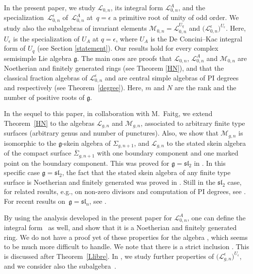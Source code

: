 \documentclass[10pt,a4paper]{amsart}
\numberwithin{equation}{section}
\theoremstyle{definition}
\newcommand{\e}{\epsilon}
\newcommand{\Ll}{{\mathcal L}}
\newcommand{\Mm}{{\mathcal M}}
\begin{document}
In the present paper, we study $\Ll_{0,n}$, its integral form $\Ll_{0,n}^A$, and the specialization~$\Ll_{0,n}^\e$ of~$\Ll_{0,n}^A$ at~$q=\e$ a primitive root of unity of odd order. We study also the subalgebras of invariant elements $\Mm_{0,n} = \Ll_{0,n}^{U_q}$ and $\bigl(\Ll_{0,n}^\e\bigr)^{U_\e}$. Here, $U_\e$ is the specialization of $U_A$ at $q=\epsilon$, where $U_A$ is the De Concini--Kac integral form of $U_q$ (see Section \ref{statement}). Our results hold for every complex semisimple Lie algebra $\mathfrak{g}$. The main ones are proofs that $\Ll_{0,n}$, $\Ll_{0,n}^A$ and $\Mm_{0,n}$ are Noetherian and finitely generated rings (see Theorem \ref{HN}), and that the classical fraction algebras of $\Ll_{0,n}^\e$ and \smash{$\bigl(\Ll_{0,n}^\e\bigr)^{U_\e}$} are central simple algebras of PI degrees  and  respectively (see Theorem~\ref{degree}). Here, $m$ and $N$ are the rank and the number of positive roots of $\mathfrak{g}$.

In the sequel \cite{BFR} to this paper, in collaboration with M.~Faitg, we extend Theorem~\ref{HN} to the algebras $\Ll_{g,n}$ and $\Mm_{g,n}$, associated to arbitrary finite type surfaces (arbitrary genus and number of punctures). Also, we show that $\Mm_{g,n}$ is isomorphic to the $\mathfrak{g}$-skein algebra of $\Sigma_{g,n+1}$, and $\Ll_{g,n}$ to the stated skein algebra of the compact surface $\overline{\Sigma}_{g,n+1}$ with one boundary component and one marked point on the boundary component. This was proved for $\mathfrak{g}={\mathfrak{sl}_2}$ in \cite{Faitg4}. In this specific case $\mathfrak{g}={\mathfrak{sl}_2}$, the fact that the stated skein algebra of any finite type surface is Noetherian and finitely generated was proved in \cite{LY}. Still in the ${\mathfrak{sl}_2}$ case, for related results, e.g., on non-zero divisors and computation of PI degrees, see \cite{BW,BW1,FKL,KK,K0,K1,KQ,Le}. For recent results on~${\mathfrak{g} ={\mathfrak{sl}_n}}$, see \cite{LeSik, Wang}.

By using the analysis developed in the present paper for $\Ll_{0,n}^A$, one can define the integral form~\smash{$\Ll_{g,n}^A$} as well, and show that it is a Noetherian and finitely generated ring. We do not have a proof yet of these properties for the algebra \smash{$\Mm_{0,n}^{A}$}, which seems to be much more difficult to handle. We note that there is a strict inclusion \smash{$\Mm_{0,n}^{A,\e} \subset \bigl(\Ll_{0,n}^\e\bigr)^{U_\e}$}. This is discussed after Theorem~\ref{Llibre}. In \cite{BFR2}, we study further properties of $\bigl(\Ll_{g,n}^\e\bigr)^{U_\e}$, and we consider also the subalgebra~\smash{$\Mm_{g,n}^{A,\e}$}.
\end{document}
